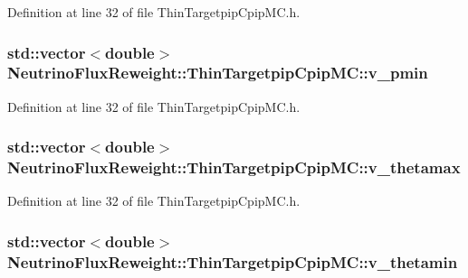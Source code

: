 Definition at line 32 of file Thin\-Targetpip\-Cpip\-M\-C.\-h.

\hypertarget{class_neutrino_flux_reweight_1_1_thin_targetpip_cpip_m_c_acfe77250a611ddad7eff49870fc1cc79}{
\subsubsection[{v\-\_\-pmin}]{\setlength{\rightskip}{0pt plus 5cm}std\-::vector$<$double$>$ Neutrino\-Flux\-Reweight\-::\-Thin\-Targetpip\-Cpip\-M\-C\-::v\-\_\-pmin\hspace{0.3cm}{\ttfamily [private]}}}\label{class_neutrino_flux_reweight_1_1_thin_targetpip_cpip_m_c_acfe77250a611ddad7eff49870fc1cc79}


Definition at line 32 of file Thin\-Targetpip\-Cpip\-M\-C.\-h.

\hypertarget{class_neutrino_flux_reweight_1_1_thin_targetpip_cpip_m_c_a338bfb845380a4c3badcb591821b8da0}{
\subsubsection[{v\-\_\-thetamax}]{\setlength{\rightskip}{0pt plus 5cm}std\-::vector$<$double$>$ Neutrino\-Flux\-Reweight\-::\-Thin\-Targetpip\-Cpip\-M\-C\-::v\-\_\-thetamax\hspace{0.3cm}{\ttfamily [private]}}}\label{class_neutrino_flux_reweight_1_1_thin_targetpip_cpip_m_c_a338bfb845380a4c3badcb591821b8da0}


Definition at line 32 of file Thin\-Targetpip\-Cpip\-M\-C.\-h.

\hypertarget{class_neutrino_flux_reweight_1_1_thin_targetpip_cpip_m_c_adbd4423fe4ede8e69dc1019fd3988c40}{
\subsubsection[{v\-\_\-thetamin}]{\setlength{\rightskip}{0pt plus 5cm}std\-::vector$<$double$>$ Neutrino\-Flux\-Reweight\-::\-Thin\-Targetpip\-Cpip\-M\-C\-::v\-\_\-thetamin\hspace{0.3cm}{\ttfamily [private]}}}\label{class_neutrino_flux_reweight_1_1_thin_targetpip_cpip_m_c_adbd4423fe4ede8e69dc1019fd3988c40}


